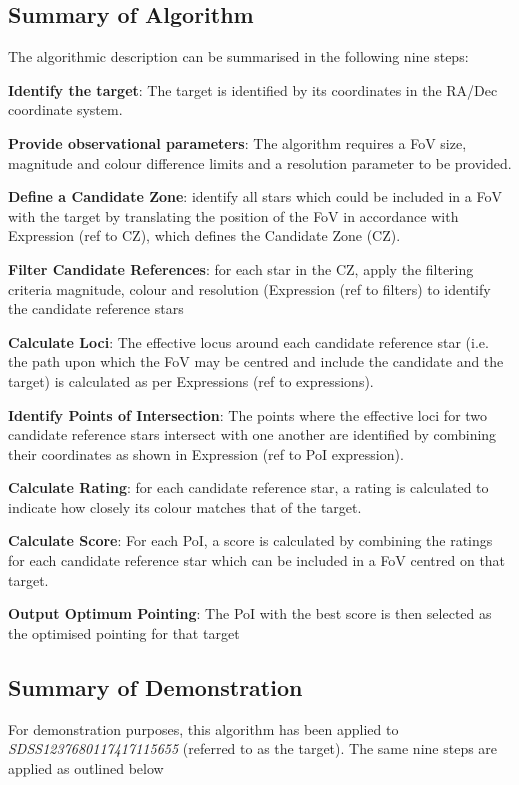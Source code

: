 \documentclass{aa}
\begin{document}
\subsection{Summary of Algorithm}
The algorithmic description can be summarised in the following nine steps:

\textbf{Identify the target}: The target is identified by its coordinates in the RA/Dec coordinate system.

\textbf{Provide observational parameters}: The algorithm requires a FoV size, magnitude and colour difference limits and a resolution parameter to be provided.

\textbf{Define a Candidate Zone}: identify all stars which could be included in a FoV with the target by translating the position of the FoV in accordance with Expression (ref to CZ), which defines the Candidate Zone (CZ).

\textbf{Filter Candidate References}: for each star in the CZ, apply the filtering criteria magnitude, colour and resolution (Expression (ref to filters) to identify the candidate reference stars

\textbf{Calculate Loci}: The effective locus around each candidate reference star (i.e. the path upon which the FoV may be centred and include the candidate and the target) is calculated as per Expressions (ref to expressions).

\textbf{Identify Points of Intersection}: The points where the effective loci for two candidate reference stars intersect with one another are identified by combining their coordinates as shown in Expression (ref to PoI expression).

\textbf{Calculate Rating}: for each candidate reference star, a rating is calculated to indicate how closely its colour matches that of the target.

\textbf{Calculate Score}: For each PoI, a score is calculated by combining the ratings for each candidate reference star which can be included in a FoV centred on that target.

\textbf{Output Optimum Pointing}: The PoI with the best score is then selected as the optimised pointing for that target

\subsection{Summary of Demonstration}
For demonstration purposes, this algorithm has been applied to \textit{SDSS1237680117417115655} (referred to as the target). The same nine steps are
applied as outlined below
\end{document}
